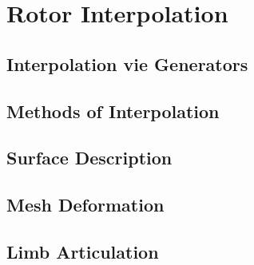 \chapter{Rotor Interpolation}

\section{Interpolation vie Generators}

\section{Methods of Interpolation}

\section{Surface Description}

\section{Mesh Deformation}

\section{Limb Articulation}
